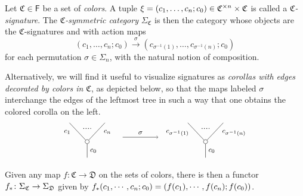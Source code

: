 \documentclass[a4paper,10pt
,draft
]{article}%
\renewcommand{\1}{\eta}%
\begin{document}
\begin{definition}\label{CSYM DEF}
	Let $\mathfrak {C} \in \mathsf{F}$ be a set of \textit{colors}.
	A tuple
	$\xi = (c_1, \ldots, c_n; c_0) \in \mathfrak C^{\times n} \times \mathfrak C$
	is called a \textit{$\mathfrak {C}$-signature}.
	The \textit{$\mathfrak C$-symmetric category} $\Sigma_{\mathfrak C}$ is then the category whose objects are the $\mathfrak{C}$-signatures and with action maps
\[
(c_1, \ldots, c_n; c_0) \xrightarrow{\sigma} (c_{\sigma^{-1}(1)}, \ldots, c_{\sigma^{-1}(n)}; c_0)
\]
	for each permutation $\sigma \in \Sigma_n$, with the natural notion of composition.

Alternatively, we will find it useful to visualize signatures as \textit{corollas with edges decorated by colors in $\mathfrak{C}$}, as depicted below, so that the maps labeled $\sigma$ interchange the edges of the leftmost tree in such a way that one obtains the colored corolla on the left.
\[
\begin{tikzpicture}
      [grow=up,auto,level distance=2.3em,every node/.style = {font=\footnotesize},dummy/.style={circle,draw,inner sep=0pt,minimum size=1.75mm}]
      
      \node at (0,0) [font=\normalsize]{}
		child{node [dummy] {}
			child{
			edge from parent node [swap,near end] {$c_n$} node [name=Kn] {}}
			child{
			edge from parent node [near end] {$c_1$}
node [name=Kone,swap] {}}
		edge from parent node [swap] {$c_0$}
		};
		\draw [dotted,thick] (Kone) -- (Kn) ;
	\node at (5,0) [font=\normalsize]{}
		child{node [dummy] {}
			child{
			edge from parent node [swap,near end] {$c_{\sigma^{-1}(n)}$} node [name=Kn] {}}
			child{
			edge from parent node [near end] {$c_{\sigma^{-1}(1)}$}
node [name=Kone,swap] {}}
		edge from parent node [swap] {$c_0$}
		};
		\draw [dotted,thick] (Kone) -- (Kn) ;

\draw[->] (1.5,1) -- node{$\sigma$} (3,1);
\end{tikzpicture}
\]
Given any map $f \colon \mathfrak{C} \to \mathfrak{D}$ on the sets of colors, there is then a functor
$f_{\**} \colon \Sigma_{\mathfrak{C}} \to \Sigma_{\mathfrak{D}}$
given by $f_{\**} (c_1,\cdots,c_n;c_0) = (f(c_1),\cdots,f(c_n);f(c_0))$. 
\end{definition}
\end{document}
